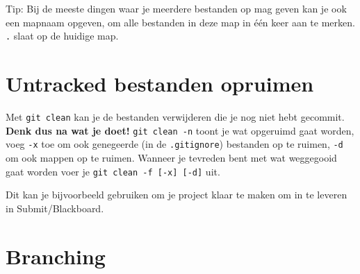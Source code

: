 \documentclass[9pt,a4paper]{extarticle}
\newcommand{\shell}[1]{\texttt{#1}}
\newcommand{\shell}[1]{\texttt{#1}}
\newlength{\OptieBreed}
\begin{document}
Tip: Bij de meeste dingen waar je meerdere bestanden op mag geven kan je ook een mapnaam opgeven, om
alle bestanden in deze map in \'e\'en keer aan te merken. \texttt{.} slaat op de huidige map.

\section*{Untracked bestanden opruimen}
Met \shell{git clean} kan je de bestanden verwijderen die je nog niet hebt gecommit.
\textbf{Denk dus na wat je doet!} \shell{git clean -n} toont je wat opgeruimd gaat worden, voeg \shell{-x} toe om ook
genegeerde (in de \shell{.gitignore}) bestanden op te ruimen, \shell{-d} om ook mappen op te ruimen. Wanneer je tevreden
bent met wat weggegooid gaat worden voer je \danger{} \shell{git clean -f [-x] [-d]} \danger{} uit.

Dit kan je bijvoorbeeld gebruiken om je project klaar te maken om in te leveren in Submit/Blackboard.


\section*{Branching}
\settowidth{\OptieBreed}{\shell{git checkout --no-merged }}
\end{document}
